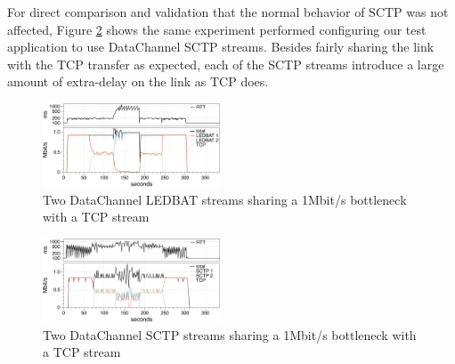 \documentclass{sig-alternate}
\begin{document}
For direct comparison and validation that the normal behavior of SCTP was not affected,
Figure \ref{fig:2sctp_tcp} shows the same experiment performed configuring our test
application to use DataChannel SCTP streams. Besides fairly sharing the link with the TCP
transfer as expected, each of the SCTP streams introduce a large amount of extra-delay on
the link as TCP does.


\begin{figure}[t]
  \centering
    \includegraphics[width=0.47\textwidth]{figs/2ledbat_tcp}
\vspace*{-0.38cm}
	\caption{Two DataChannel LEDBAT streams sharing a 1Mbit/s bottleneck with a TCP stream} \label{fig:2ledbat_tcp}
\end{figure}

\begin{figure}[t]
  \centering
    \includegraphics[width=0.47\textwidth]{figs/2sctp_tcp}
\vspace*{-0.38cm}
	\caption{Two DataChannel SCTP  streams sharing a 1Mbit/s bottleneck with a TCP stream} \label{fig:2sctp_tcp}
\vspace*{-0.4cm}
\end{figure}



\end{document}
